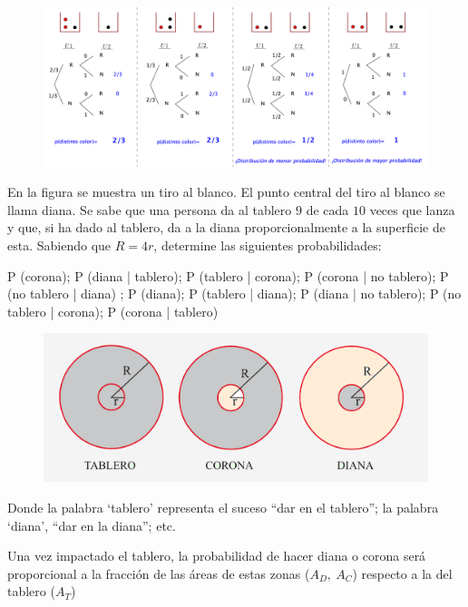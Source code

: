 	\begin{figure}[H]
		\centering
		\includegraphics[width=1.05\textwidth]{imagenes/imagenes02/T02IM46.png}
	\end{figure}



\vspace{5mm}
\begin{ejemplo}
\begin{ejer}
En la figura se muestra un tiro al blanco. El punto central del tiro al blanco se llama diana. Se sabe que una persona da al tablero $9$ de cada $10$ veces que lanza y que, si ha dado al tablero, da a la diana proporcionalmente a la superficie de esta. Sabiendo que $R = 4r$, determine las siguientes probabilidades: 

P (corona); P (diana | tablero); P (tablero | corona); P (corona | no tablero); P (no tablero | diana) ; P (diana); P (tablero | diana); P (diana | no tablero); P (no tablero | corona); P (corona | tablero)

	\begin{figure}[H]
		\centering
		\includegraphics[width=.75\textwidth]{imagenes/imagenes02/T02IM51.png}
	\end{figure}

Donde la palabra `tablero' representa el suceso ``dar en el tablero''; la palabra `diana', ``dar en la diana''; etc. 		
\end{ejer}
\end{ejemplo}

Una vez impactado el tablero, la probabilidad de hacer diana o corona será proporcional a la fracción de las áreas de estas zonas ($A_D,\ A_C$) respecto a la del tablero ($A_T$)

